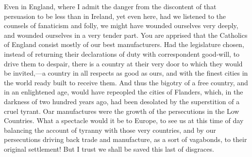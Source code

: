 Even in England, where I admit the danger from the discontent of that persuasion to be less than in Ireland, yet even here, had we listened to the counsels of fanaticism and folly, we might have wounded ourselves very deeply, and wounded ourselves in a very tender part. You are apprised that the Catholics of England consist mostly of our best manufacturers. Had the legislature chosen, instead of returning their declarations of duty with correspondent good-will, to drive them to despair, there is a country at their very door to which they would be invited,—a country in all respects as good as ours, and with the finest cities in the world ready built to receive them. And thus the bigotry of a free country, and in an enlightened age, would have repeopled the cities of Flanders, which, in the darkness of two hundred years ago, had been desolated by the superstition of a cruel tyrant. Oar manufactures were the growth of the persecutions in the Low Countries. What a spectacle would it be to Europe, to see us at this time of day balancing the account of tyranny with those very countries, and by our persecutions driving back trade and manufacture, as a sort of vagabonds, to their original settlement! But I trust we shall be saved this last of disgraces.


